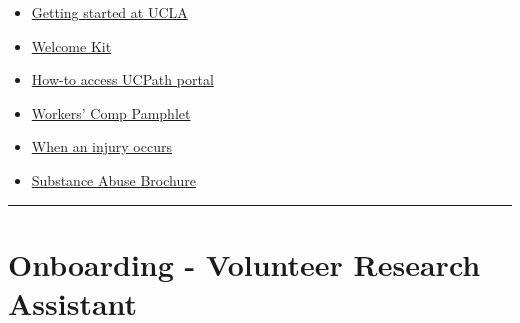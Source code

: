 \documentclass[]{book}
\providecommand{\tightlist}{%
  \setlength{\itemsep}{0pt}\setlength{\parskip}{0pt}}
\begin{document}
\begin{itemize}
\tightlist
\item
  \href{https://www.chr.ucla.edu/new-employee/getting-started}{Getting started at UCLA}
\item
  \href{https://ucnet.universityofcalifornia.edu/forms/pdf/welcome-kit.pdf}{Welcome Kit}
\item
  \href{https://www.centralresourceunit.ucla.edu/s/}{How-to access UCPath portal}
\item
  \href{https://ucla.app.box.com/s/jyzoag8v9qw6katuvgegjil8an2tsx2j}{Workers' Comp
  Pamphlet}
\item
  \href{https://ucla.app.box.com/s/nua4ypfpjlt1226fusney4zyvo6qzzhj}{When an injury occurs}
\item
  \href{https://ucla.app.box.com/s/qrj4j7bnca1r8fy9n1bdfdf6orf1g0dq}{Substance Abuse Brochure}
\end{itemize}

\begin{center}\rule{0.5\linewidth}{\linethickness}\end{center}

\hypertarget{onboarding---volunteer-research-assistant}{%
\section{Onboarding - Volunteer Research Assistant}\label{onboarding---volunteer-research-assistant}}
\end{document}
